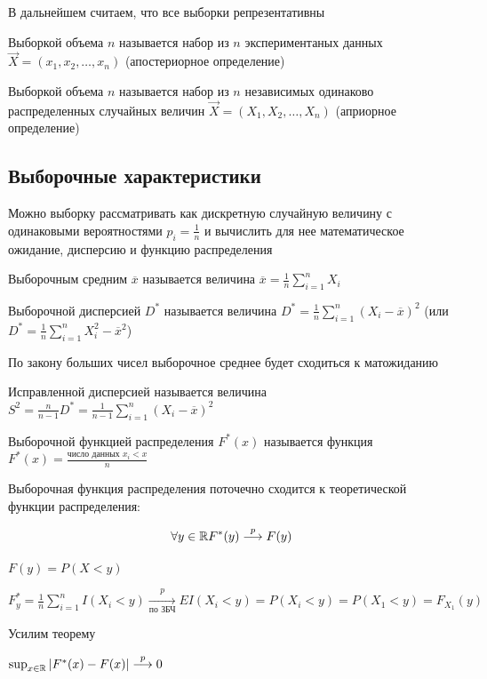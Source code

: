 \documentclass[12pt]{article}
\begin{document}
В дальнейшем считаем, что все выборки репрезентативны

 Выборкой объема $n$ называется набор из $n$ экспериментаных данных $\vec{X} = (x_1, x_2, \dots, x_n)$ (апостериорное определение)

 Выборкой объема $n$ называется набор из $n$ независимых одинаково распределенных случайных
величин $\vec{X} = (X_1, X_2, \dots, X_n)$ (априорное определение)

\subsection{Выборочные характеристики}

Можно выборку рассматривать как дискретную случайную величину с одинаковыми вероятностями $p_i = \frac{1}{n}$
и вычислить для нее математическое ожидание, дисперсию и функцию распределения

\Def Выборочным средним $\overline{x}$ называется величина $\overline{x} = \frac{1}{n} \sum_{i = 1}^n X_i$

\Defs Выборочной дисперсией $D^*$ называется величина $D^* = \frac{1}{n} \sum_{i = 1}^n (X_i - \overline{x})^2$ (или $D^* = \frac{1}{n} \sum_{i = 1}^n X_i^2 - \overline{x}^2$)

По закону больших чисел выборочное среднее будет сходиться к матожиданию

\Defs Исправленной дисперсией называется величина $S^2 = \frac{n}{n - 1} D^* = \frac{1}{n - 1}\sum_{i = 1}^n (X_i - \overline{x})^2$

\Def Выборочной функцией распределения $F^*(x)$ называется функция $F^*(x) = \frac{\text{число данных } x_i < x}{n}$

\begin{MyTheorem}
    \Ths Выборочная функция распределения поточечно сходится к теоретической функции распределения:

    \[\forall y \in \mathbb{R} F^*(y) \overset{p}{\longrightarrow} F(y)\]
\end{MyTheorem}

\begin{MyProof}
    $F(y) = P(X < y)$

    $F^*_y = \frac{1}{n} \sum_{i = 1}^n I(X_i < y) \underset{\text{по ЗБЧ}}{\overset{p}{\longrightarrow}} EI(X_i < y) = P(X_i < y) = 
    P(X_1 < y) = F_{X_1}(y)$
\end{MyProof}

Усилим теорему

\begin{MyTheorem}
     $\sup_{x \in \mathbb{R}} |F^*(x) - F(x)| \overset{p}{\longrightarrow} 0$
\end{MyTheorem}
\end{document}
